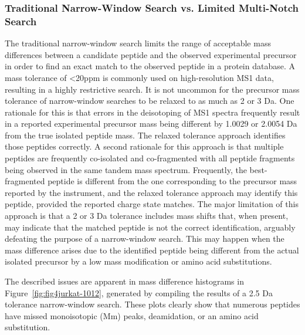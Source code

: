 \documentclass[journal=jprobs,manuscript=article]{achemso}
\begin{document}
\subsubsection{Traditional Narrow-Window Search vs. Limited Multi-Notch Search}

The traditional narrow-window search limits the range of acceptable mass differences between a candidate peptide and the observed experimental precursor in order to find an exact match to the observed peptide in a protein database.
A mass tolerance of <20ppm is commonly used on high-resolution MS1 data, resulting in a highly restrictive search.
It is not uncommon for the precursor mass tolerance of narrow-window searches to be relaxed to as much as 2 or 3 Da.
One rationale for this is that errors in the deisotoping of MS1 spectra frequently result in a reported experimental precursor mass being different by 1.0029 or 2.0054 Da from the true isolated peptide mass.
The relaxed tolerance approach identifies those peptides correctly.
A second rationale for this approach is that multiple peptides are frequently co-isolated and co-fragmented with all peptide fragments being observed in the same tandem mass spectrum.
Frequently, the best-fragmented peptide is different from the one corresponding to the precursor mass reported by the instrument, and the relaxed tolerance approach may identify this peptide, provided the reported charge state matches.
The major limitation of this approach is that a 2 or 3 Da tolerance includes mass shifts that, when present, may indicate that the matched peptide is not the correct identification, arguably defeating the purpose of a narrow-window search.
This may happen when the mass difference arises due to the identified peptide being different from the actual isolated precursor by a low mass modification or amino acid substitutions.

The described issues are apparent in mass difference histograms in Figure~\ref{fig:fig4jurkat-1012}, generated by compiling the results of a 2.5 Da tolerance narrow-window search.
These plots clearly show that numerous peptides have missed monoisotopic (Mm) peaks, deamidation, or an amino acid substitution.
\end{document}
